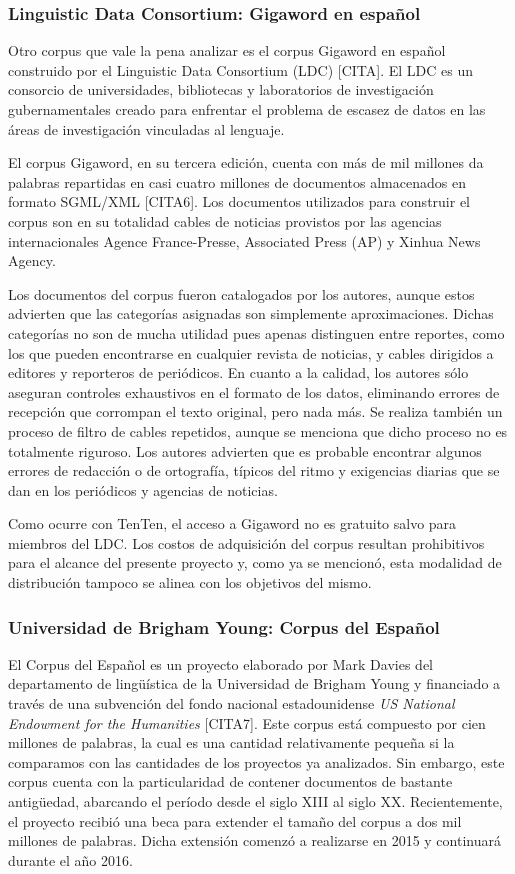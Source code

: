 \subsubsection{Linguistic Data Consortium: Gigaword en español}

Otro corpus que vale la pena analizar es el corpus Gigaword en español construido por el Linguistic Data
Consortium (LDC) [CITA]. El LDC es un consorcio de universidades, bibliotecas y laboratorios de
investigación gubernamentales creado para enfrentar el problema de escasez de datos en las áreas de
investigación vinculadas al lenguaje.

El corpus Gigaword, en su tercera edición, cuenta con más de mil millones da palabras repartidas en casi
cuatro millones de documentos almacenados en formato SGML/XML [CITA6]. Los documentos utilizados para
construir el corpus son en su totalidad cables de noticias provistos por las agencias internacionales
Agence France-Presse, Associated Press (AP) y Xinhua News Agency.

Los documentos del corpus fueron catalogados por los autores, aunque estos advierten que las categorías
asignadas son simplemente aproximaciones. Dichas categorías no son de mucha utilidad pues apenas
distinguen entre reportes, como los que pueden encontrarse en cualquier revista de noticias, y cables
dirigidos a editores y reporteros de periódicos. En cuanto a la calidad, los autores sólo aseguran
controles exhaustivos en el formato de los datos, eliminando errores de recepción que corrompan el
texto original, pero nada más. Se realiza también un proceso de filtro de cables repetidos, aunque se
menciona que dicho proceso no es totalmente riguroso. Los autores advierten que es probable encontrar
algunos errores de redacción o de ortografía, típicos del ritmo y exigencias diarias que se dan en los
periódicos y agencias de noticias.

Como ocurre con TenTen, el acceso a Gigaword no es gratuito salvo para miembros del LDC. Los costos de
adquisición del corpus resultan prohibitivos para el alcance del presente proyecto y, como ya se mencionó,
esta modalidad de distribución tampoco se alinea con los objetivos del mismo.

\subsubsection{Universidad de Brigham Young: Corpus del Español}

El Corpus del Español es un proyecto elaborado por Mark Davies del departamento de lingüística de
la Universidad de Brigham Young y financiado a través de una subvención del fondo nacional
estadounidense \textit{US National Endowment for the Humanities} [CITA7]. Este corpus está compuesto
por cien millones de palabras, la cual es una cantidad relativamente pequeña si la comparamos con las
cantidades de los proyectos ya analizados. Sin embargo,  este corpus cuenta con la particularidad de
contener documentos de bastante antigüedad, abarcando el período desde el siglo XIII al siglo XX.
Recientemente, el proyecto recibió una beca para extender el tamaño del corpus a dos mil millones de
palabras. Dicha extensión comenzó a realizarse en 2015 y continuará durante el año 2016.

